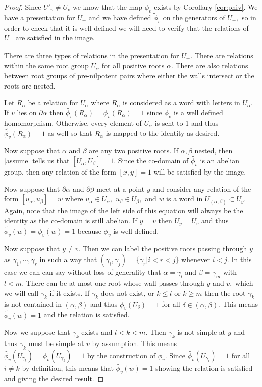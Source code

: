 \documentclass[class=book, crop=false,12 pt]{standalone}
\begin{document}
\begin{proof}
	Since $U'_v\neq U_v$ we know that the map $\phi_v$ exists by Corollary \ref{cor:phiv}. We have a presentation for $U_+$ and we have defined $\tilde{\phi}_v$ on the generators of $U_+,$ so in order to check that it is well defined we will need to verify that the relations of $U_+$ are satisfied in the image.

	There are three types of relations in the presentation for $U_+.$ There are relations within the same root group $U_\alpha$ for all positive roots $\alpha.$ There are also relations between root groups of pre-nilpotent pairs where either the walls intersect or the roots are nested.

	Let $R_\alpha$ be a relation for $U_\alpha$ where $R_\alpha$ is considered as a word with letters in $U_\alpha.$ If $v$ lies on $\partial \alpha$ then $\tilde{\phi_v}(R_\alpha)=\phi_v(R_\alpha)=1$ since $\phi_v$ is a well defined homomorphism. Otherwise, every element of $U_\alpha$ is sent to 1 and thus $\tilde{\phi_v}(R_\alpha)=1$ as well so that $R_\alpha$ is mapped to the identity as desired.

	Now suppose that $\alpha$ and $\beta$ are any two positive roots. If $\alpha,\beta$ nested, then \eqref{assume} tells us that $[U_\alpha,U_\beta]=1.$ Since the co-domain of $\tilde{\phi_v}$ is an abelian group, then any relation of the form $[x,y]=1$ will be satisfied by the image.


	Now suppose that $\partial \alpha$ and $\partial \beta$ meet at a point $y$ and consider any relation of the form $[u_\alpha,u_\beta]=w$ where $u_\alpha\in U_\alpha,$ $u_\beta\in U_\beta,$ and $w$ is a word in $U_{(\alpha,\beta)}\subset U_y.$ Again, note that the image of the left side of this equation will always be the identity as the co-domain is still abelian. If $y=v$ then $U_y=U_v$ and thus $\tilde{\phi_v}(w)=\phi_v(w)=1$ because $\phi_v$ is well defined.

	Now suppose that $y\neq v.$ Then we can label the positive roots passing through $y$ as $\gamma_1,\cdots,\gamma_r$ in such a way that $(\gamma_i,\gamma_j)=\{\gamma_{r}|i<r<j\}$ whenever $i<j.$ In this case we can can say without loss of generality that $\alpha=\gamma_l$ and $\beta=\gamma_m$ with $l<m.$  There can be at most one root whose wall passes through $y$ and $v,$ which we will call $\gamma_k$ if it exists. If $\gamma_k$ does not exist, or $k\le l$ or $k\ge m$ then the root $\gamma_k$ is not contained in $(\alpha,\beta)$ and thus $\tilde{\phi_v}(U_\delta)=1$ for all $\delta\in (\alpha,\beta).$ This means $\tilde{\phi_v}(w)=1$ and the relation is satisfied.

	Now we suppose that $\gamma_k$ exists and $l<k<m.$ Then $\gamma_k$ is not simple at $y$ and thus $\gamma_k$ must be simple at $v$ by assumption. This means $\tilde{\phi_v}(U_{\gamma_k})=\phi_v(U_{\gamma_k})=1$ by the construction of $\phi_v.$ Since $\tilde{\phi_v}(U_{\gamma_i})=1$ for all $i\neq k$ by definition, this means that $\tilde{\phi_v}(w)=1$ showing the relation is satisfied and giving the desired result.
\end{proof}
\end{document}
